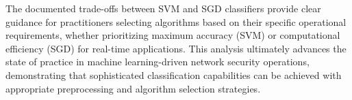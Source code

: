 \documentclass[12pt,a4paper]{article}
\begin{document}
The documented trade-offs between SVM and SGD classifiers provide clear guidance for practitioners selecting algorithms based on their specific operational requirements, whether prioritizing maximum accuracy (SVM) or computational efficiency (SGD) for real-time applications. This analysis ultimately advances the state of practice in machine learning-driven network security operations, demonstrating that sophisticated classification capabilities can be achieved with appropriate preprocessing and algorithm selection strategies.
\end{document}
